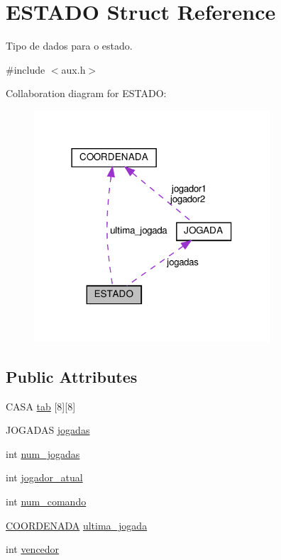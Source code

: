 \hypertarget{structESTADO}{}\section{E\+S\+T\+A\+DO Struct Reference}
\label{structESTADO}


Tipo de dados para o estado.  




{\ttfamily \#include $<$aux.\+h$>$}



Collaboration diagram for E\+S\+T\+A\+DO\+:\nopagebreak
\begin{figure}[H]
\begin{center}
\leavevmode
\includegraphics[width=249pt]{structESTADO__coll__graph}
\end{center}
\end{figure}
\subsection*{Public Attributes}
\begin{DoxyCompactItemize}
\item 
C\+A\+SA \hyperlink{structESTADO_ab56f0f1be16954d3768b4174d14c087d}{tab} \mbox{[}8\mbox{]}\mbox{[}8\mbox{]}
\item 
J\+O\+G\+A\+D\+AS \hyperlink{structESTADO_afae43b87a488fad0f2b56a18bad31d18}{jogadas}
\item 
int \hyperlink{structESTADO_a261495728744647e618b4e623f5a4b7a}{num\+\_\+jogadas}
\item 
int \hyperlink{structESTADO_a5dd28e2e68b7aef2b6b7ea88e02eff58}{jogador\+\_\+atual}
\item 
int \hyperlink{structESTADO_adf1064dfc09145b6995a7897249f1674}{num\+\_\+comando}
\item 
\hyperlink{structCOORDENADA}{C\+O\+O\+R\+D\+E\+N\+A\+DA} \hyperlink{structESTADO_a4896a5c5c1f40b43fb795623327e3f47}{ultima\+\_\+jogada}
\item 
int \hyperlink{structESTADO_afa5918b4f2221416965663d44b14e179}{vencedor}
\end{DoxyCompactItemize}


